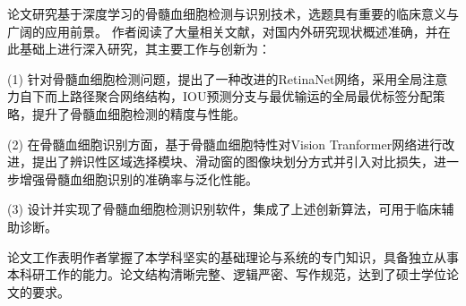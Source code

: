 
\begin{comments}
论文研究基于深度学习的骨髓血细胞检测与识别技术，选题具有重要的临床意义与广阔的应用前景。
作者阅读了大量相关文献，对国内外研究现状概述准确，并在此基础上进行深入研究，其主要工作与创新为：

(1) 针对骨髓血细胞检测问题，提出了一种改进的RetinaNet网络，采用全局注意力自下而上路径聚合网络结构，IOU预测分支与最优输运的全局最优标签分配策略，提升了骨髓血细胞检测的精度与性能。 

(2) 在骨髓血细胞识别方面，基于骨髓血细胞特性对Vision Tranformer网络进行改进，提出了辨识性区域选择模块、滑动窗的图像块划分方式并引入对比损失，进一步增强骨髓血细胞识别的准确率与泛化性能。

(3) 设计并实现了骨髓血细胞检测识别软件，集成了上述创新算法，可用于临床辅助诊断。 

论文工作表明作者掌握了本学科坚实的基础理论与系统的专门知识，具备独立从事本科研工作的能力。论文结构清晰完整、逻辑严密、写作规范，达到了硕士学位论文的要求。

\end{comments}
